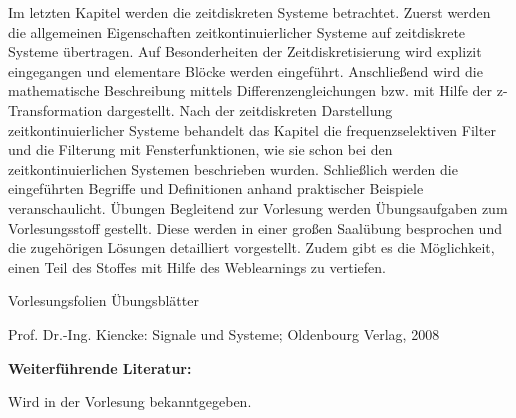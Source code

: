 \begin{course}
\begin{content}
Im letzten Kapitel werden die zeitdiskreten Systeme betrachtet. Zuerst werden die allgemeinen Eigenschaften zeitkontinuierlicher Systeme auf zeitdiskrete Systeme übertragen. Auf Besonderheiten der Zeitdiskretisierung wird explizit eingegangen und elementare Blöcke werden eingeführt. Anschließend wird die mathematische Beschreibung mittels Differenzengleichungen bzw. mit Hilfe der z-Transformation dargestellt. Nach der zeitdiskreten Darstellung zeitkontinuierlicher Systeme behandelt das Kapitel die frequenzselektiven Filter und die Filterung mit Fensterfunktionen, wie sie schon bei den zeitkontinuierlichen Systemen beschrieben wurden. Schließlich werden die eingeführten Begriffe und Definitionen anhand praktischer Beispiele veranschaulicht.\newline
Übungen\newline
Begleitend zur Vorlesung werden Übungsaufgaben zum Vorlesungsstoff gestellt. Diese werden in einer großen Saalübung besprochen und die zugehörigen Lösungen detailliert vorgestellt. Zudem gibt es die Möglichkeit, einen Teil des Stoffes mit Hilfe des Weblearnings zu vertiefen.


\end{content}

\begin{media}Vorlesungsfolien\newline
Übungsblätter

\end{media}

\begin{literature}Prof. Dr.-Ing. Kiencke: Signale und Systeme; Oldenbourg Verlag, 2008

 

\textbf{Weiterführende Literatur:}

 

Wird in der Vorlesung bekanntgegeben.

\end{literature}



\end{course}